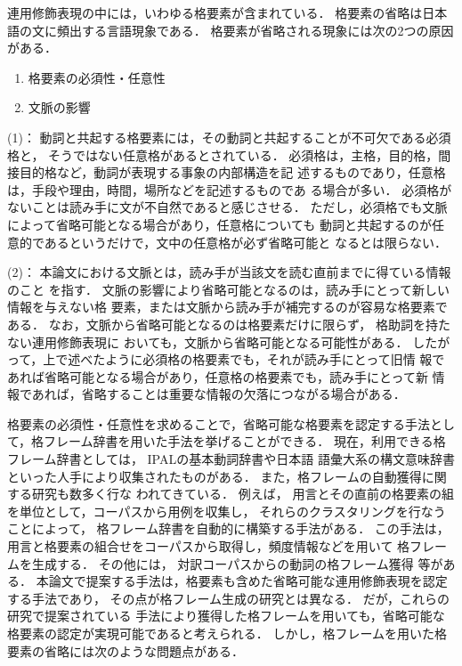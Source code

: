 連用修飾表現の中には，いわゆる格要素が含まれている．
格要素の省略は日本語の文に頻出する言語現象である．
格要素が省略される現象には次の2つの原因がある．
\begin{enumerate}
\item 格要素の必須性・任意性
\item 文脈の影響
\end{enumerate}

(1)：
動詞と共起する格要素には，その動詞と共起することが不可欠である必須格と，
そうではない任意格があるとされている\cite{IPAL}．
必須格は，主格，目的格，間接目的格など，動詞が表現する事象の内部構造を記
述するものであり，任意格は，手段や理由，時間，場所などを記述するものであ
る場合が多い．
必須格がないことは読み手に文が不自然であると感じさせる．
ただし，必須格でも文脈によって省略可能となる場合があり，任意格についても
動詞と共起するのが任意的であるというだけで，文中の任意格が必ず省略可能と
なるとは限らない．

(2)：
本論文における文脈とは，読み手が当該文を読む直前までに得ている情報のこと
を指す．
文脈の影響により省略可能となるのは，読み手にとって新しい情報を与えない格
要素，または文脈から読み手が補完するのが容易な格要素である．
なお，文脈から省略可能となるのは格要素だけに限らず，
格助詞を持たない連用修飾表現に
おいても，文脈から省略可能となる可能性がある．
したがって，上で述べたように必須格の格要素でも，それが読み手にとって旧情
報であれば省略可能となる場合があり，任意格の格要素でも，読み手にとって新
情報であれば，省略することは重要な情報の欠落につながる場合がある．

格要素の必須性・任意性を求めることで，省略可能な格要素を認定する手法とし
て，格フレーム辞書を用いた手法を挙げることができる．
現在，利用できる格フレーム辞書としては， IPALの基本動詞辞書\cite{IPAL}や日本語
語彙大系\cite{goi}の構文意味辞書といった人手により収集されたものがある．
また，格フレームの自動獲得に関する研究も数多く行な
われてきている．
例えば，
用言とその直前の格要素の組を単位として，コーパスから用例を収集し，
それらのクラスタリングを行なうことによって，
格フレーム辞書を自動的に構築する手法\cite{kawahara}がある．
この手法は，用言と格要素の組合せをコーパスから取得し，頻度情報などを用いて
格フレームを生成する．
その他には，
対訳コーパスからの動詞の格フレーム獲得\cite{utsuro1} 等がある．
本論文で提案する手法は，格要素も含めた省略可能な連用修飾表現を認定する手法であり，
その点が格フレーム生成の研究とは異なる．
だが，これらの研究で提案されている
手法により獲得した格フレームを用いても，省略可能な格要素の認定が実現可能であると考えられる．
しかし，格フレームを用いた格要素の省略には次のような問題点がある．

